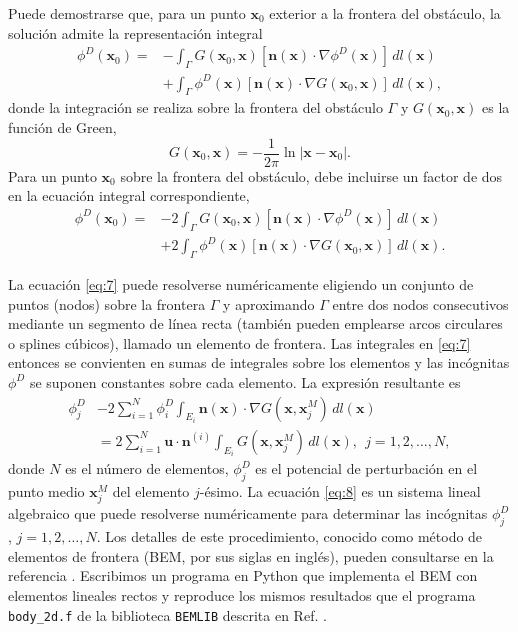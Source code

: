 \documentclass[11pt]{article}
\begin{document}
Puede demostrarse \cite{pozrikidis2002practical} que, para un punto $\mathbf{x}_0$ exterior a la frontera del obstáculo, la solución admite la representación integral
\begin{align}
\phi^{D}(\mathbf{x}_0) = 
& - \int_{\Gamma} G(\mathbf{x}_0, \mathbf{x}) 
\left[ \mathbf{n}(\mathbf{x}) \cdot \nabla \phi^{D}(\mathbf{x}) \right] \, dl(\mathbf{x}) \nonumber \\
& + \int_{\Gamma} \phi^{D}(\mathbf{x}) 
\left[ \mathbf{n}(\mathbf{x}) \cdot \nabla G(\mathbf{x}_0, \mathbf{x}) \right] \, dl(\mathbf{x}) ,\label{eq:6}
\end{align}
donde la integración se realiza sobre la frontera del obstáculo $\Gamma$ y $G(\mathbf{x}_0,\mathbf{x})$ es la función de Green,
  \begin{equation}
    \label{eq:7}
   G(\mathbf{x}_0,\mathbf{x}) = -\frac{1}{2\pi}\ln{|\mathbf{x}-\mathbf{x}_0|}.
  \end{equation}
  Para un punto $\mathbf{x}_0$ sobre la frontera del obstáculo, debe incluirse un factor de dos en la ecuación integral correspondiente,
  \begin{align}
\phi^{D}(\mathbf{x}_0) = 
& - 2\int_{\Gamma} G(\mathbf{x}_0, \mathbf{x}) 
\left[ \mathbf{n}(\mathbf{x}) \cdot \nabla \phi^{D}(\mathbf{x}) \right] \, dl(\mathbf{x}) \nonumber \\
& + 2\int_{\Gamma} \phi^{D}(\mathbf{x}) 
\left[ \mathbf{n}(\mathbf{x}) \cdot \nabla G(\mathbf{x}_0, \mathbf{x}) \right] \, dl(\mathbf{x})\label{eq:7}.  \end{align}

La ecuación \eqref{eq:7} puede resolverse numéricamente eligiendo un conjunto de puntos (nodos) sobre la frontera $\Gamma$ y aproximando $\Gamma$ entre dos nodos consecutivos mediante un segmento de línea recta (también pueden emplearse arcos circulares o splines cúbicos), llamado un elemento de frontera. Las integrales en \eqref{eq:7} entonces se convienten en sumas de integrales sobre los elementos y las incógnitas $\phi^D$ se suponen constantes sobre cada elemento. La expresión resultante es
\begin{align}
\phi^{D}_{j} 
&- 2 \sum_{i=1}^{N} \phi^{D}_{i} 
   \int_{E_i} \mathbf{n}(\mathbf{x}) \cdot \nabla G(\mathbf{x}, \mathbf{x}^{M}_{j}) \, dl(\mathbf{x}) \nonumber \\
&= 2 \sum_{i=1}^{N} 
   \mathbf{u} \cdot \mathbf{n}^{(i)} 
   \int_{E_i} G(\mathbf{x}, \mathbf{x}^{M}_{j}) \, dl(\mathbf{x}) ,~~j=1,2,\ldots,N,\label{eq:8}
\end{align}
donde $N$ es el número de elementos, $\phi^D_j$ es el potencial de perturbación en el punto medio $\mathbf{x}^M_j$ del elemento $j$-ésimo. La ecuación \eqref{eq:8} es un sistema lineal algebraico que puede resolverse numéricamente para determinar las incógnitas $\phi^D_j$, $j=1,2,\ldots,N$. Los detalles de este procedimiento, conocido como método de elementos de frontera (BEM, por sus siglas en inglés), pueden consultarse en la referencia \cite{pozrikidis2002practical}. Escribimos un programa en Python que implementa el BEM con elementos lineales rectos y reproduce los mismos resultados que el programa {\tt body\_2d.f} de la biblioteca {\tt BEMLIB} descrita en Ref. \cite{pozrikidis2002practical}.
\end{document}
